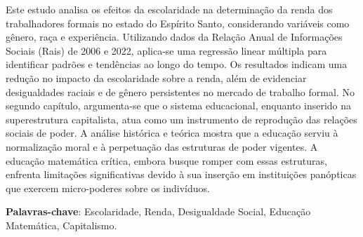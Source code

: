 %  



\setlength{\absparsep}{18pt}
\begin{resumo}
  Este estudo analisa os efeitos da escolaridade na determinação da renda dos trabalhadores formais no estado do Espírito Santo, considerando variáveis como gênero, raça e experiência. Utilizando dados da Relação Anual de Informações Sociais (Rais) de 2006 e 2022, aplica-se uma regressão linear múltipla para identificar padrões e tendências ao longo do tempo. Os resultados indicam uma redução no impacto da escolaridade sobre a renda, além de evidenciar desigualdades raciais e de gênero persistentes no mercado de trabalho formal. No segundo capítulo, argumenta-se que o sistema educacional, enquanto inserido na superestrutura capitalista, atua como um instrumento de reprodução das relações sociais de poder. A análise histórica e teórica mostra que a educação serviu à normalização moral e à perpetuação das estruturas de poder vigentes. A educação matemática crítica, embora busque romper com essas estruturas, enfrenta limitações significativas devido à sua inserção em instituições panópticas que exercem micro-poderes sobre os indivíduos.

  \textbf{Palavras-chave}: Escolaridade, Renda, Desigualdade Social, Educação Matemática, Capitalismo.
\end{resumo}

